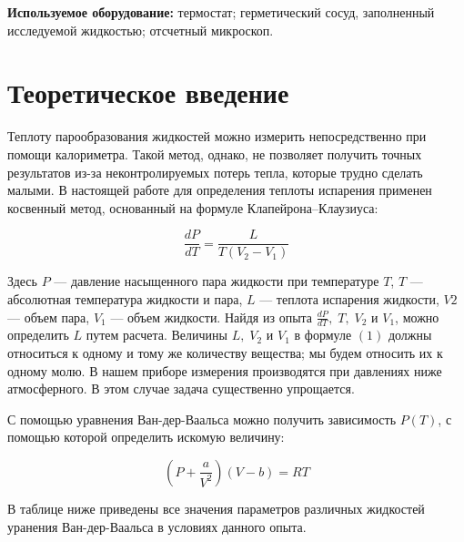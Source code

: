\documentclass[a4paper, 12pt]{article} %
\begin{document}
\textbf{Используемое оборудование:} термостат; герметический сосуд, заполненный исследуемой жидкостью; отсчетный микроскоп.

\section{Теоретическое введение}

Теплоту парообразования жидкостей можно измерить непосредственно при помощи калориметра. Такой метод, однако, не позволяет получить точных результатов из-за неконтролируемых потерь тепла, которые трудно сделать малыми. В настоящей работе для определения теплоты испарения применен
косвенный метод, основанный на формуле Клапейрона–Клаузиуса: 

\begin{equation}
    \frac{dP}
{dT} = \frac{L}{T(V_2 - V_1)}
\end{equation}

Здесь $P$ — давление насыщенного пара жидкости при температуре $T$, $T$ — абсолютная температура жидкости и пара, $L$ — теплота испарения жидкости, $V2$ — объем пара, $V_1$ — объем жидкости. Найдя из опыта $\frac{dP}{dT},\; T,\; V_2$ и $V_1$, можно определить $L$ путем расчета. Величины $L, \;V_2$ и $V_1$ в формуле $(1)$ должны относиться к одному и тому же количеству вещества; мы будем относить их к одному молю.
В нашем приборе измерения производятся при давлениях ниже атмосферного. В этом случае задача существенно упрощается.

С помощью уравнения Ван-дер-Ваальса можно получить зависимость $P(T)$, с помощью которой определить искомую величину:

\begin{equation}
    \left(P+\frac{a}{V^2}\right)(V-b) = RT
\end{equation}

В таблице ниже приведены все значения параметров различных жидкостей уранения Ван-дер-Ваальса в условиях данного опыта.

\begin{figure}[h]
\end{figure}
\end{document}
